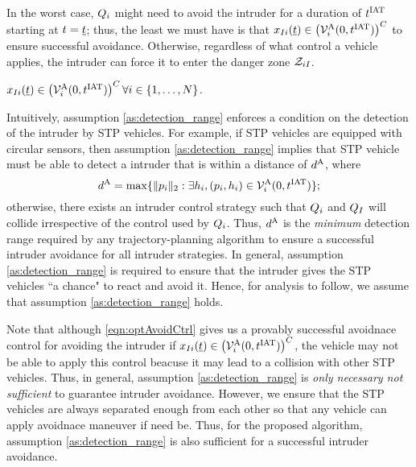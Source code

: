 In the worst case, $Q_i$ might need to avoid the intruder for a duration of $t^\text{IAT}$ starting at $t = \underline{t}$; thus, the least we must have is that $x_{I i}(\underline{t}) \in \left(\mathcal{V}^{\text{A}}_{i}(0, t^\text{IAT})\right)^C$ to ensure successful avoidance. Otherwise, regardless of what control a vehicle applies, the intruder can force it to enter the danger zone $\mathcal{Z}_{iI}$.
\begin{assumption}
\label{as:detection_range}
$x_{I i}(\underline{t}) \in \left(\mathcal{V}^{\text{A}}_{i}(0, t^\text{IAT})\right)^C \forall i \in \{1, \ldots, N\}$.
\end{assumption}
Intuitively, assumption \ref{as:detection_range} enforces a condition on the detection of the intruder by STP vehicles. For example, if STP vehicles are equipped with circular sensors, then assumption \ref{as:detection_range} implies that STP vehicle must be able to detect a intruder that is within a distance of $d^\text{A}$, where
\begin{equation} \label{eqn:sen_distance}
\dsen = \max\{ \|p_i\|_2: \exists \npos_i, (p_i, \npos_i) \in \brs^{\text{A}}_{i}(0, \iat) \};
\end{equation} 
otherwise, there exists an intruder control strategy such that $Q_i$ and $Q_{I}$ will collide irrespective of the control used by $Q_i$. Thus, $d^\text{A}$ is the \textit{minimum} detection range required by any trajectory-planning algorithm to ensure a successful intruder avoidance for all intruder strategies. In general, assumption \ref{as:detection_range} is required to ensure that the intruder gives the STP vehicles ``a chance" to react and avoid it. Hence, for analysis to follow, we assume that assumption \ref{as:detection_range} holds. 

Note that although \eqref{eqn:optAvoidCtrl} gives us a provably successful avoidnace control for avoiding the intruder if $x_{I i}(\underline{t}) \in \left(\mathcal{V}^{\text{A}}_{i}(0, t^\text{IAT})\right)^C$, the vehicle may not be able to apply this control beacuse it may lead to a collision with other STP vehicles. Thus, in general, assumption \ref{as:detection_range} is \textit{only necessary not sufficient} to guarantee intruder avoidance. However, we ensure that the STP vehicles are always separated enough from each other so that any vehicle can apply avoidnace maneuver if need be. Thus, for the proposed algorithm, assumption \ref{as:detection_range} is also sufficient for a successful intruder avoidance.
